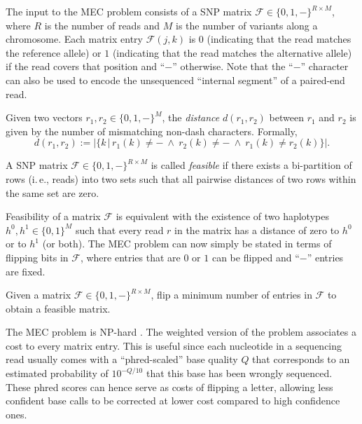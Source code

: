 The input to the MEC problem consists of a SNP matrix $\mathcal{F}\in\{0,1,-\}^{R\times M}$, where $R$ is the number of reads and $M$ is the number of variants along a chromosome.
Each matrix entry $\mathcal{F}(j,k)$ is $0$ (indicating that the read matches the reference allele) or $1$ (indicating that the read matches the alternative allele) if the read covers that position and ``$-$'' otherwise.
Note that the ``$-$'' character can also be used to encode the unsequenced ``internal segment'' of a paired-end read.

\begin{definition}[Distance]
Given two vectors $r_1,r_2\in\{0,1,-\}^M$, the \emph{distance} $d(r_1,r_2)$ between $r_1$ and $r_2$ is given by the number of mismatching non-dash characters. Formally,
\[d(r_1,r_2):=\big|\big\{k\,\big|\,r_1(k)\neq -\ \wedge\ r_2(k)\neq -\ \wedge\ r_1(k)\neq r_2(k)\big\}\big|.\]
\end{definition}

\begin{definition}[Feasibility]
A SNP matrix $\mathcal{F}\in\{0,1,-\}^{R\times M}$ is called \emph{feasible} if there exists a bi-partition of rows (i.\,e., reads) into two sets such that all pairwise distances of two rows within the same set are zero.
\end{definition}
Feasibility of a matrix $\mathcal{F}$ is equivalent with the existence of two haplotypes $h^0,h^1\in\{0,1\}^M$ such that every read $r$ in the matrix has a distance of zero to $h^0$ or to $h^1$ (or both).
The MEC problem can now simply be stated in terms of flipping bits in $\mathcal{F}$, where entries that are $0$ or $1$ can be flipped and ``$-$'' entries are fixed.

\begin{problem}[MEC]
Given a matrix $\mathcal{F}\in\{0,1,-\}^{R\times M}$, flip a minimum number of entries in $\mathcal{F}$ to obtain a feasible matrix.
\end{problem}

The MEC problem is NP-hard \citep{Cilibrasi2007}.
The weighted version of the problem associates a cost to every matrix entry.
This is useful since each nucleotide in a sequencing read usually comes with a ``phred-scaled'' base quality $Q$ that corresponds to an estimated probability of $10^{-Q/10}$ that this base has been wrongly sequenced.
These phred scores can hence serve as costs of flipping a letter, allowing less confident base calls to be corrected at lower cost compared to high confidence ones.

